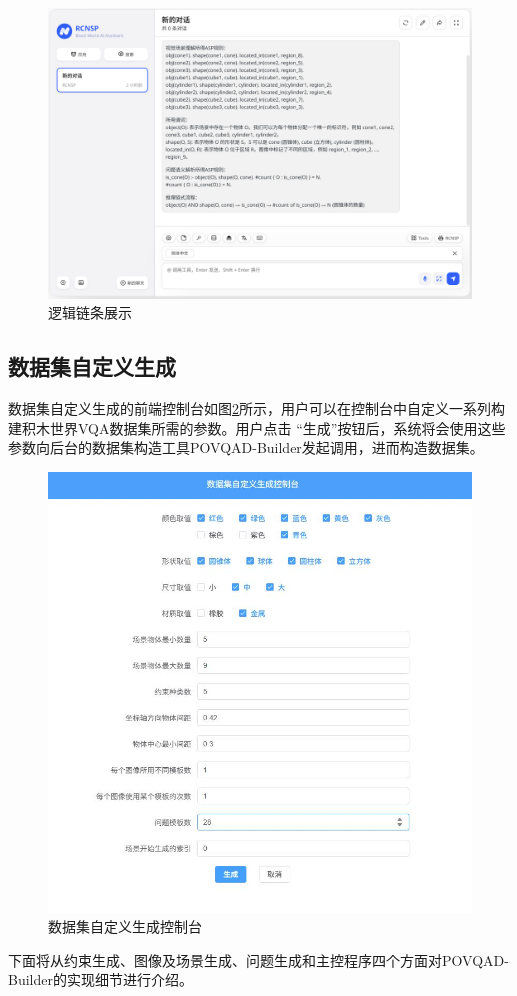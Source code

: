 \begin{figure}[h]
    \centering
    \includegraphics[scale=0.3]{figures/reasoning_path.png}
    \caption{逻辑链条展示}
    \label{fig:answer}
\end{figure}
\subsection{数据集自定义生成}
数据集自定义生成的前端控制台如图\ref{fig:dashboard}所示，用户可以在控制台中自定义一系列构建积木世界VQA数据集所需的参数。用户点击
“生成”按钮后，系统将会使用这些参数向后台的数据集构造工具POVQAD-Builder发起调用，进而构造数据集。
\begin{figure}[h]
\centering
\includegraphics[scale=0.5]{figures/dashboard.jpg}
\caption{数据集自定义生成控制台}
\label{fig:dashboard}
\end{figure}
下面将从约束生成、图像及场景生成、问题生成和主控程序四个方面对POVQAD-Builder的实现细节进行介绍。
